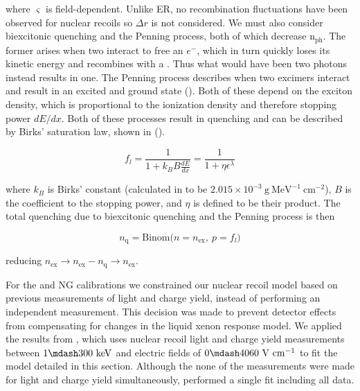 \noindent where $\varsigma$ is field-dependent.  Unlike ER, no recombination fluctuations have been observed for nuclear recoils so
$\Delta r$ is not considered.  We must also consider biexcitonic quenching and the Penning process, both of which decrease
$\mathrm{n_{ph}}$.  The former arises when two
 interact to free an $e^-$, which in turn quickly loses its kinetic energy
and recombines with a .  Thus what would have been two photons instead results in one.  The Penning process describes when
two excimers interact and result in an excited and ground state ().  Both of these depend on the exciton density, which
is proportional to the ionization density and therefore stopping power $dE / dx$.  Both of these processes result in quenching and can be
described by Birks' saturation law, shown in  ().

\begin{equation}
f_l = \frac{1}{1 + k_{B}B \frac{dE}{dx}} = \frac{1}{1 + \eta \epsilon^{\lambda}}
\label{eq:er_nr_calibrations_parameter_determ_nr_birks}
\end{equation}

\noindent where $k_B$ is Birks' constant (calculated in  to be $2.015 \times 10^{-3}\ \mathrm{g\ MeV^{-1}\ cm^{-2}}$),
$B$ is the coefficient to the stopping power, and $\eta$ is defined to be their product.  The total quenching due to biexcitonic quenching
and the Penning process is then

\begin{equation}
n_{\mathrm{q}} = \mathrm{Binom} \big( n = n_{\mathrm{ex}},\ p = f_l \big)
\end{equation}

\noindent reducing $n_{\mathrm{ex}} \rightarrow n_{\mathrm{ex}} - n_{\mathrm{q}} \rightarrow n_{\mathrm{ex}}$.

For the \ambe and NG calibrations we constrained our nuclear recoil model based on previous measurements of light and charge yield,
instead of performing an independent measurement.  This decision was made to prevent detector effects from compensating for changes
in the liquid xenon response model.  We applied the results from , which uses nuclear recoil light and charge yield
measurements between $1 \mdash 300\ \mathrm{keV}$ and electric fields of $0 \mdash 4060\ \mathrm{V\ cm^{-1}}$ to fit the model
detailed in this section.  Although the none of the measurements were made for light and charge yield simultaneously, 
performed a single fit including all data.

